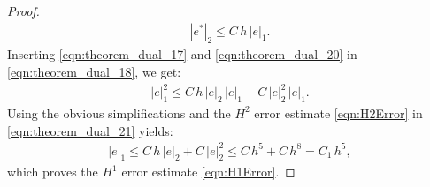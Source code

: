 \begin{proof}
\begin{eqnarray}
|e^* |_2
\leq C \, h \, | e |_1 .
\label{eqn:theorem_dual_20}
\end{eqnarray}
Inserting \eqref{eqn:theorem_dual_17} and \eqref{eqn:theorem_dual_20}  in \eqref{eqn:theorem_dual_18}, we get:
\begin{eqnarray}
|e|_1^2
\leq C \, h \, | e |_2 \, | e |_1
+ C \, | e |_2^2 \, | e |_1 .
\label{eqn:theorem_dual_21}
\end{eqnarray}
Using the obvious simplifications and the $H^2$ error estimate \eqref{eqn:H2Error} in \eqref{eqn:theorem_dual_21} yields:
\begin{eqnarray}
|e|_1
\leq C \, h \, | e |_2
+ C \, | e |_2^2
\leq C \, h^5 + C \, h^8
= C_1 \, h^5 ,
\label{eqn:theorem_dual_22}
\end{eqnarray}
which proves the $H^1$ error estimate \eqref{eqn:H1Error}.
\hfill
\end{proof}
